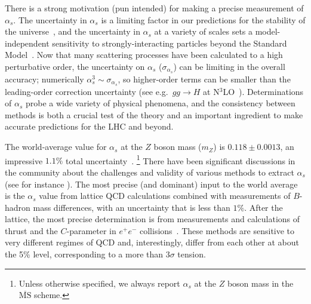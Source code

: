 \documentclass[11pt]{cernrep}
\begin{document}
There is a strong motivation (pun intended) for making a precise measurement of $\alpha_s$.
%
The uncertainty in $\alpha_s$ is a limiting factor in our predictions for the stability of the universe~\cite{Andreassen:2017rzq}, and the
uncertainty in $\alpha_s$ at a variety of scales sets a model-independent sensitivity to strongly-interacting particles beyond the Standard Model~\cite{Kaplan:2008pt,Becciolini:2014lya}.
%
Now that many scattering processes have been calculated to a high perturbative order, the uncertainty on $\alpha_s$ ($\sigma_{\alpha_s}$) can be limiting in the overall accuracy; numerically $\alpha_s^3\sim \sigma_{\alpha_s}$, so higher-order terms can be smaller than the leading-order correction uncertainty (see e.g.\ $gg\rightarrow H$ at N$^3$LO~\cite{Anastasiou:2015ema}).
%
Determinations of $\alpha_s$ probe a wide variety of physical phenomena, and the consistency between methods is both a crucial test of the theory and an important ingredient to make accurate predictions for the LHC and beyond.

The world-average value for $\alpha_s$ at the $Z$ boson mass ($m_Z$) is $0.118\pm 0.0013$, an impressive $1.1\%$ total uncertainty~\cite{Olive:2016xmw}.%
\footnote{Unless otherwise specified, we always report $\alpha_s$ at the $Z$ boson mass in the $\overline{\mathrm{MS}}$ scheme.} 
%
There have been significant discussions in the community about the challenges and validity of various methods to extract $\alpha_s$ (see for instance \cite{Bethke:2011tr,Altarelli:2013bpa,Pich:2013sqa,Moch:2014tta,dEnterria:2015kmd,Olive:2016xmw,Salam:2017qdl}).
%
The most precise (and dominant) input to the world average is the $\alpha_s$ value from lattice QCD calculations combined with measurements of $B$-hadron mass differences, with an uncertainty that is less than $1\%$. 
%
After the lattice, the most precise determination is from measurements and calculations of thrust and the $C$-parameter in $e^+e^-$ collisions~\cite{Abbate:2010xh,Hoang:2015hka,Heister:2003aj,Abdallah:2004xe,Abreu:1996mk,Abreu:1999rc,Biebel:1999zt,Adeva:1992gv,Abbiendi:2004qz,Abe:1994mf}.
%
These methods are sensitive to very different regimes of QCD and, interestingly, differ from each other at about the 5\% level, corresponding to a more than $3\sigma$ tension.  


\end{document}
